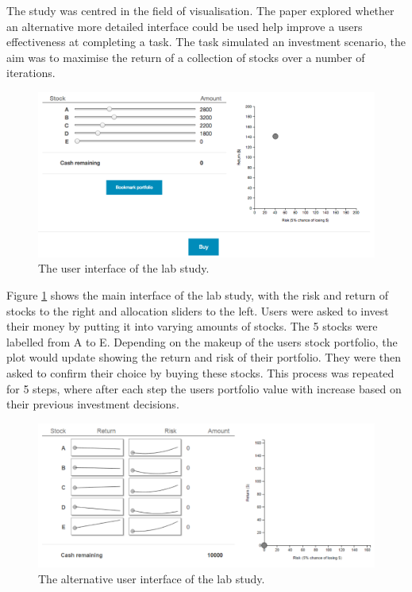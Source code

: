 \documentclass{article}
\begin{document}
The study was centred in the field of visualisation.
The paper explored whether an alternative more detailed interface could be used help improve a users effectiveness at completing a task.
The task simulated an investment scenario, the aim was to maximise the return of a collection of stocks over a number of iterations. 

\begin{figure}[ht]
    \centering
    \includegraphics[scale=0.3, frame]{Images/interface.png}
    \caption{The user interface of the lab study.}
    \label{fig:interface}
\end{figure}

Figure \ref{fig:interface} shows the main interface of the lab study, with the risk and return of stocks to the right and allocation sliders to the left.
Users were asked to invest their money by putting it into varying amounts of stocks.
The 5 stocks were labelled from A to E.
Depending on the makeup of the users stock portfolio, the plot would update showing the return and risk of their portfolio.
They were then asked to confirm their choice by buying these stocks.
This process was repeated for 5 steps, where after each step the users portfolio value with increase based on their previous investment decisions. 

\begin{figure}[ht]
    \centering
    \includegraphics[scale=0.45, frame]{Images/interfaceSA.png}
    \caption{The alternative user interface of the lab study.}
    \label{fig:interfaceSA}
\end{figure}
\end{document}
